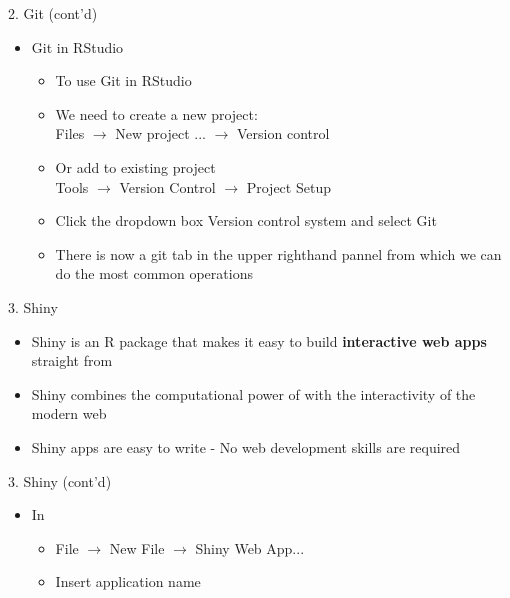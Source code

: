 \documentclass[14pt, aspectratio=169, sectionpage=simple, xclolor=table]{beamer}
\begin{document}
\begin{frame}{2. Git (cont'd)}
\begin{itemize}	
\item Git in RStudio
\begin{itemize}	
\item To use Git in RStudio
\item We need to create a \alert{new project}: \\
Files $\rightarrow$ New project ... $\rightarrow$ Version control
\item Or add to \alert{existing project} \\
Tools $\rightarrow$ Version Control $\rightarrow$ Project Setup
\item Click the dropdown box Version control system and select Git
\item There is now a \alert{git tab} in the upper righthand pannel from which we can do the most common operations  
\end{itemize}
\end{itemize}	
\end{frame}


\begin{frame}{3. Shiny}
\begin{itemize}
	\item Shiny is an R package that makes it easy to build \textbf{interactive web apps} straight from \R 
	\item Shiny combines the computational power of \R with the interactivity of the modern web
	\item Shiny apps are easy to write - No web development skills are required
\end{itemize}


\end{frame}
\begin{frame}{3. Shiny (cont'd)}
\begin{itemize}
\item In 
\vspace{1ex}
\vspace{1ex}
\begin{itemize}
	\item File $\rightarrow$ New File $\rightarrow$ Shiny Web App...
	\item Insert application name
\end{itemize}
\end{itemize}
\end{frame}
\end{document}
